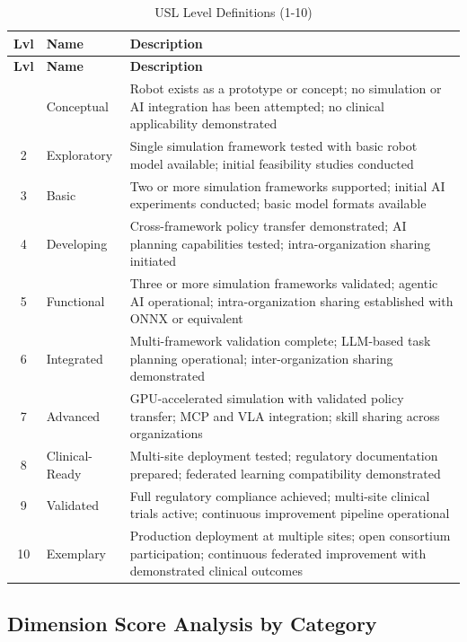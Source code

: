 \begin{longtable}{c l p{12.5cm}}
\caption{USL Level Definitions (1-10)}
\label{tab:usl-levels} \\
\toprule
\textbf{Lvl} & \textbf{Name} & \textbf{Description} \\
\midrule
\endfirsthead
\toprule
\textbf{Lvl} & \textbf{Name} & \textbf{Description} \\
\midrule
\endhead
\bottomrule
\endfoot
1 & Conceptual & Robot exists as a prototype or concept; no simulation or AI integration has been attempted; no clinical applicability demonstrated \\
2 & Exploratory & Single simulation framework tested with basic robot model available; initial feasibility studies conducted \\
3 & Basic & Two or more simulation frameworks supported; initial AI experiments conducted; basic model formats available \\
4 & Developing & Cross-framework policy transfer demonstrated; AI planning capabilities tested; intra-organization sharing initiated \\
5 & Functional & Three or more simulation frameworks validated; agentic AI operational; intra-organization sharing established with ONNX or equivalent \\
6 & Integrated & Multi-framework validation complete; LLM-based task planning operational; inter-organization sharing demonstrated \\
7 & Advanced & GPU-accelerated simulation with validated policy transfer; MCP and VLA integration; skill sharing across organizations \\
8 & Clinical-Ready & Multi-site deployment tested; regulatory documentation prepared; federated learning compatibility demonstrated \\
9 & Validated & Full regulatory compliance achieved; multi-site clinical trials active; continuous improvement pipeline operational \\
10 & Exemplary & Production deployment at multiple sites; open consortium participation; continuous federated improvement with demonstrated clinical outcomes \\
\end{longtable}

\subsection{Dimension Score Analysis by Category}
\label{subsec:dimension-analysis}

